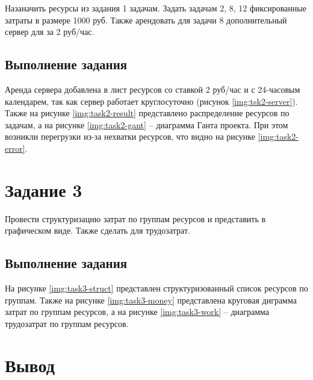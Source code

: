 Назаначить ресурсы из задания 1 задачам. Задать задачам 2, 8, 12 фиксированные затраты в размере 1000 руб. Также арендовать для задачи 8 дополнительный сервер для за 2 руб/час.

\subsection{Выполнение задания}

Аренда сервера добавлена в лист ресурсов со ставкой 2 руб/час и с 24-часовым календарем, так как сервер работает круглосуточно (рисунок \ref{img:tsk2-server}). Также на рисунке \ref{img:task2-result} представлено распределение ресурсов по задачам, а на рисунке \ref{img:task2-gant} -- диаграмма Ганта проекта. При этом возникли перегрузки из-за нехватки ресурсов, что видно на рисунке \ref{img:task2-error}.



\section{Задание 3}

Провести структуризацию затрат по группам ресурсов и представить в графическом виде. Также сделать для трудозатрат.

\subsection{Выполнение задания}

На рисунке \ref{img:task3-struct} представлен структуризованный список ресурсов по группам. Также на рисунке \ref{img:task3-money} представлена круговая диграмма затрат по группам ресурсов, а на рисунке \ref{img:task3-work} -- диаграмма трудозатрат по группам ресурсов.



\newpage

\section*{Вывод}

